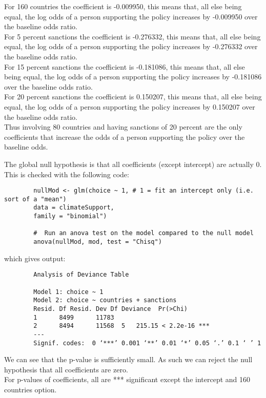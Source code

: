 \documentclass{article}
\begin{document}
	For 160 countries the coefficient is -0.009950, this means that, all else being equal, the log odds of a person supporting the policy increases by -0.009950 over the baseline odds ratio.\\
	For 5 percent sanctions the coefficient is -0.276332, this means that, all else being equal, the log odds of a person supporting the policy increases by -0.276332 over the baseline odds ratio.\\
	For 15 percent sanctions the coefficient is -0.181086, this means that, all else being equal, the log odds of a person supporting the policy increases by -0.181086 over the baseline odds ratio.\\
	For 20 percent sanctions the coefficient is 0.150207, this means that, all else being equal, the log odds of a person supporting the policy increases by 0.150207 over the baseline odds ratio.\\
	Thus involving 80 countries and having sanctions of 20 percent are the only coefficients that increase the odds of a person supporting the policy over the baseline odds.\\
	\vspace{10mm}
	
	
	
	The global null hypothesis is that all coefficients (except intercept) are actually 0. This is checked with the following code:
	\begin{verbatim}
		nullMod <- glm(choice ~ 1, # 1 = fit an intercept only (i.e. sort of a "mean") 
		data = climateSupport, 
		family = "binomial")
		
		#  Run an anova test on the model compared to the null model 
		anova(nullMod, mod, test = "Chisq")
	\end{verbatim}
	which gives output:
	\begin{verbatim}
		Analysis of Deviance Table
		
		Model 1: choice ~ 1
		Model 2: choice ~ countries + sanctions
		Resid. Df Resid. Dev Df Deviance  Pr(>Chi)    
		1      8499      11783                          
		2      8494      11568  5   215.15 < 2.2e-16 ***
		---
		Signif. codes:  0 ‘***’ 0.001 ‘**’ 0.01 ‘*’ 0.05 ‘.’ 0.1 ‘ ’ 1
	\end{verbatim}
	We can see that the p-value is sufficiently small. As such we can reject the null hypothesis that all coefficients are zero.\\
	For p-values of coefficients, all are *** significant except the intercept and 160 countries option.
	\clearpage
	
\end{document}
